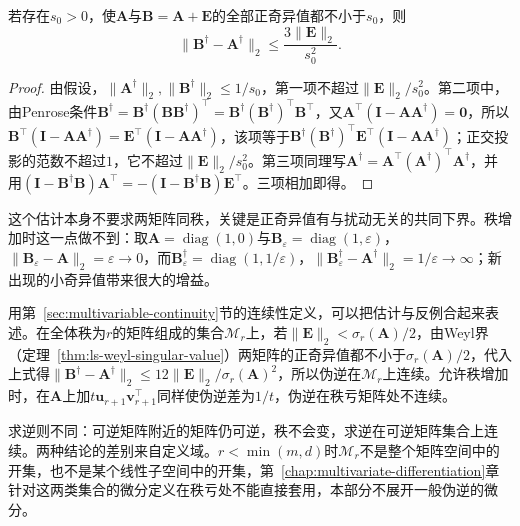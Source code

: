 \begin{theorem}[伪逆的扰动界]
\label{thm:ls-pseudoinverse-perturbation}
若存在$s_0>0$，使$\bm A$与$\bm B=\bm A+\bm E$的全部正奇异值都不小于$s_0$，则
\begin{equation}
 \lVert\bm B^\dagger-\bm A^\dagger\rVert_2\leq\frac{3\lVert\bm E\rVert_2}{s_0^2}.
 \label{eq:ch06-pseudoinverse-fixed-rank-perturbation}
\end{equation}
\end{theorem}
\begin{proof}
由假设，$\lVert\bm A^\dagger\rVert_2,\lVert\bm B^\dagger\rVert_2\leq1/s_0$，第一项不超过$\lVert\bm E\rVert_2/s_0^2$。第二项中，由Penrose条件$\bm B^\dagger=\bm B^\dagger(\bm B\bm B^\dagger)^\top=\bm B^\dagger(\bm B^\dagger)^\top\bm B^\top$，又$\bm A^\top(\bm I-\bm A\bm A^\dagger)=\bm0$，所以$\bm B^\top(\bm I-\bm A\bm A^\dagger)=\bm E^\top(\bm I-\bm A\bm A^\dagger)$，该项等于$\bm B^\dagger(\bm B^\dagger)^\top\bm E^\top(\bm I-\bm A\bm A^\dagger)$；正交投影的范数不超过$1$，它不超过$\lVert\bm E\rVert_2/s_0^2$。第三项同理写$\bm A^\dagger=\bm A^\top(\bm A^\dagger)^\top\bm A^\dagger$，并用$(\bm I-\bm B^\dagger\bm B)\bm A^\top=-(\bm I-\bm B^\dagger\bm B)\bm E^\top$。三项相加即得。
\end{proof}

这个估计本身不要求两矩阵同秩，关键是正奇异值有与扰动无关的共同下界。秩增加时这一点做不到：取$\bm A=\operatorname{diag}(1,0)$与$\bm B_\varepsilon=\operatorname{diag}(1,\varepsilon)$，$\lVert\bm B_\varepsilon-\bm A\rVert_2=\varepsilon\to0$，而$\bm B_\varepsilon^\dagger=\operatorname{diag}(1,1/\varepsilon)$，$\lVert\bm B_\varepsilon^\dagger-\bm A^\dagger\rVert_2=1/\varepsilon\to\infty$；新出现的小奇异值带来很大的增益。

用第~\ref{sec:multivariable-continuity}节的连续性定义，可以把估计与反例合起来表述。在全体秩为$r$的矩阵组成的集合$\mathcal M_r$上，若$\lVert\bm E\rVert_2<\sigma_r(\bm A)/2$，由Weyl界（定理~\ref{thm:ls-weyl-singular-value}）两矩阵的正奇异值都不小于$\sigma_r(\bm A)/2$，代入上式得$\lVert\bm B^\dagger-\bm A^\dagger\rVert_2\leq12\lVert\bm E\rVert_2/\sigma_r(\bm A)^2$，所以伪逆在$\mathcal M_r$上连续。允许秩增加时，在$\bm A$上加$t\bm u_{r+1}\bm v_{r+1}^\top$同样使伪逆差为$1/t$，伪逆在秩亏矩阵处不连续。

求逆则不同：可逆矩阵附近的矩阵仍可逆，秩不会变，求逆在可逆矩阵集合上连续。两种结论的差别来自定义域。$r<\min(m,d)$时$\mathcal M_r$不是整个矩阵空间中的开集，也不是某个线性子空间中的开集，第~\ref{chap:multivariate-differentiation}章针对这两类集合的微分定义在秩亏处不能直接套用，本部分不展开一般伪逆的微分。

